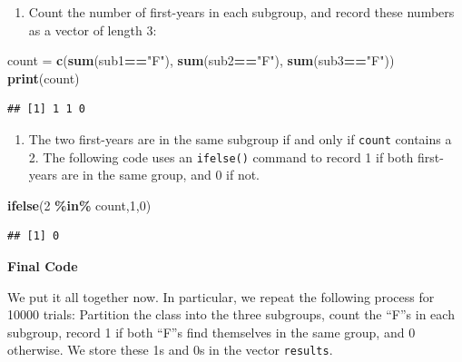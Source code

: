 \documentclass[
]{book}
\newenvironment{Shaded}{\begin{snugshade}}{\end{snugshade}}
\newcommand{\DecValTok}[1]{\textcolor[rgb]{0.00,0.00,0.81}{#1}}
\newcommand{\FunctionTok}[1]{\textcolor[rgb]{0.13,0.29,0.53}{\textbf{#1}}}
\newcommand{\NormalTok}[1]{#1}
\newcommand{\OtherTok}[1]{\textcolor[rgb]{0.56,0.35,0.01}{#1}}
\newcommand{\SpecialCharTok}[1]{\textcolor[rgb]{0.81,0.36,0.00}{\textbf{#1}}}
\newcommand{\StringTok}[1]{\textcolor[rgb]{0.31,0.60,0.02}{#1}}
\providecommand{\tightlist}{%
  \setlength{\itemsep}{0pt}\setlength{\parskip}{0pt}}
\theoremstyle{definition}
\theoremstyle{definition}
\theoremstyle{definition}
\theoremstyle{definition}
\theoremstyle{remark}
\begin{document}
\begin{enumerate}
\def\labelenumi{\arabic{enumi}.}
\setcounter{enumi}{2}
\tightlist
\item
  Count the number of first-years in each subgroup, and record these numbers as a vector of length 3:
\end{enumerate}

\begin{Shaded}
\begin{Highlighting}[]
\NormalTok{count }\OtherTok{=} \FunctionTok{c}\NormalTok{(}\FunctionTok{sum}\NormalTok{(sub1}\SpecialCharTok{==}\StringTok{"F"}\NormalTok{),}
            \FunctionTok{sum}\NormalTok{(sub2}\SpecialCharTok{==}\StringTok{"F"}\NormalTok{),}
            \FunctionTok{sum}\NormalTok{(sub3}\SpecialCharTok{==}\StringTok{"F"}\NormalTok{))}
\FunctionTok{print}\NormalTok{(count)}
\end{Highlighting}
\end{Shaded}

\begin{verbatim}
## [1] 1 1 0
\end{verbatim}

\begin{enumerate}
\def\labelenumi{\arabic{enumi}.}
\setcounter{enumi}{3}
\tightlist
\item
  The two first-years are in the same subgroup if and only if \texttt{count} contains a 2. The following code uses an \texttt{ifelse()} command to record 1 if both first-years are in the same group, and 0 if not.
\end{enumerate}

\begin{Shaded}
\begin{Highlighting}[]
\FunctionTok{ifelse}\NormalTok{(}\DecValTok{2} \SpecialCharTok{\%in\%}\NormalTok{ count,}\DecValTok{1}\NormalTok{,}\DecValTok{0}\NormalTok{)}
\end{Highlighting}
\end{Shaded}

\begin{verbatim}
## [1] 0
\end{verbatim}

\textbf{Final Code}

We put it all together now. In particular, we repeat the following process for 10000 trials: Partition the class into the three subgroups, count the ``F''s in each subgroup, record 1 if both ``F''s find themselves in the same group, and 0 otherwise. We store these 1s and 0s in the vector \texttt{results}.
\end{document}
